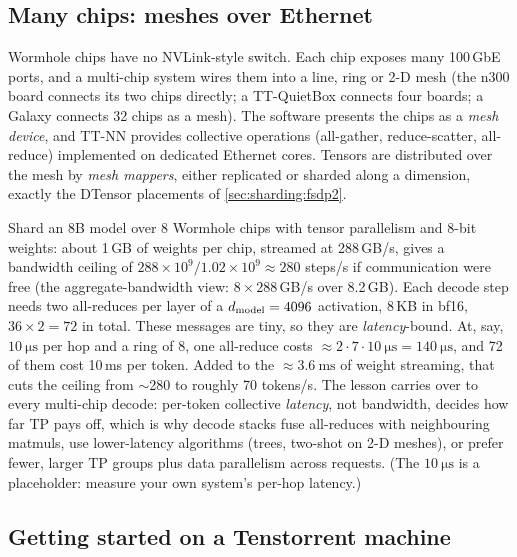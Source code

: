 \subsection{Many chips: meshes over Ethernet}

Wormhole chips have no NVLink-style switch. Each chip exposes many 100\,GbE ports, and a
multi-chip system wires them into a line, ring or 2-D mesh (the n300 board connects its two chips
directly; a TT-QuietBox connects four boards; a Galaxy connects 32 chips as a mesh). The software
presents the chips as a \emph{mesh device}, and TT-NN provides collective operations (all-gather,
reduce-scatter, all-reduce) implemented on dedicated Ethernet cores. Tensors are distributed over
the mesh by \emph{mesh mappers}, either replicated or sharded along a dimension, exactly the DTensor
placements of \cref{sec:sharding:fsdp2}.

\begin{napkinmath}
Shard an 8B model over 8 Wormhole chips with tensor parallelism and 8-bit weights: about 1\,GB of
weights per chip, streamed at 288\,GB/s, gives a bandwidth ceiling of
$288\times10^9/1.02\times10^9\approx280$ steps/s if communication were free (the
aggregate-bandwidth view: $8\times288$\,GB/s over 8.2\,GB). Each decode step needs two all-reduces
per layer of a $d_{\text{model}}=4096$ activation, 8\,KB in bf16, $36\times2=72$ in total. These messages are
tiny, so they are \emph{latency}-bound. At, say, $\SI{10}{\micro\second}$ per hop and a ring of 8, one
all-reduce costs $\approx 2\cdot7\cdot\SI{10}{\micro\second}=\SI{140}{\micro\second}$, and 72 of
them cost 10\,ms per token. Added to the $\approx\SI{3.6}{\milli\second}$ of weight streaming, that cuts the ceiling from
$\sim$280 to roughly 70 tokens/s.
The lesson carries over to every multi-chip decode: per-token collective \emph{latency}, not bandwidth,
decides how far TP pays off, which is why decode stacks fuse all-reduces with neighbouring matmuls,
use lower-latency algorithms (trees, two-shot on 2-D meshes), or prefer fewer, larger TP groups plus
data parallelism across requests. (The $\SI{10}{\micro\second}$ is a placeholder: measure
your own system's per-hop latency.)
\end{napkinmath}

\subsection{Getting started on a Tenstorrent machine}


